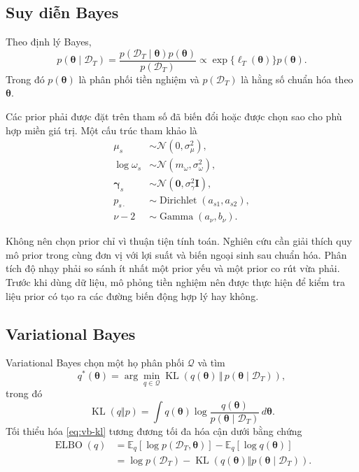 \documentclass[12pt,a4paper]{article}
\numberwithin{equation}{section}
\newcommand{\bm}[1]{\symbf{#1}}
\newcommand{\Data}{\mathcal{D}}
\newcommand{\Param}{\bm{\theta}}
\newcommand{\E}{\mathbb{E}}
\newcommand{\ELBO}{\operatorname{ELBO}}
\newcommand{\KL}{\operatorname{KL}}
\begin{document}
\subsection{Suy diễn Bayes}\label{subsec:bayes}

Theo định lý Bayes,
\begin{equation}
  p(\Param\mid\Data_T)
  =
  \frac{p(\Data_T\mid\Param)p(\Param)}{p(\Data_T)}
  \propto
  \exp\{\ell_T(\Param)\}p(\Param).
  \label{eq:bayes-posterior}
\end{equation}
Trong đó $p(\Param)$ là phân phối tiền nghiệm và $p(\Data_T)$ là hằng số chuẩn hóa theo $\Param$.

Các prior phải được đặt trên tham số đã biến đổi hoặc được chọn sao cho phù hợp miền giá trị. Một cấu trúc tham khảo là
\begin{align}
  \mu_s &\sim \mathcal{N}(0,\sigma_{\mu}^{2}),
  \label{eq:prior-mu}\\
  \log\omega_s &\sim \mathcal{N}(m_{\omega},\sigma_{\omega}^{2}),
  \label{eq:prior-omega}\\
  \bm\gamma_s &\sim \mathcal{N}(\bm 0,\sigma_{\gamma}^{2}\bm I),
  \label{eq:prior-gamma}\\
  p_{s\cdot} &\sim \operatorname{Dirichlet}(a_{s1},a_{s2}),
  \label{eq:prior-transition}\\
  \nu-2 &\sim \operatorname{Gamma}(a_{\nu},b_{\nu}).
  \label{eq:prior-df}
\end{align}

Không nên chọn prior chỉ vì thuận tiện tính toán. Nghiên cứu cần giải thích quy mô prior trong cùng đơn vị với lợi suất và biến ngoại sinh sau chuẩn hóa. Phân tích độ nhạy phải so sánh ít nhất một prior yếu và một prior co rút vừa phải. Trước khi dùng dữ liệu, mô phỏng tiền nghiệm nên được thực hiện để kiểm tra liệu prior có tạo ra các đường biến động hợp lý hay không.

\subsection{Variational Bayes}\label{subsec:vb}

Variational Bayes chọn một họ phân phối $\mathcal{Q}$ và tìm
\begin{equation}
  q^{*}(\Param)
  =
  \arg\min_{q\in\mathcal{Q}}
  \KL\!\left(q(\Param)\,\Vert\,p(\Param\mid\Data_T)\right),
  \label{eq:vb-kl}
\end{equation}
trong đó
\begin{equation}
  \KL(q\Vert p)
  =
  \int q(\Param)
  \log\frac{q(\Param)}{p(\Param\mid\Data_T)}\,d\Param.
  \label{eq:kl-definition}
\end{equation}
Tối thiểu hóa \cref{eq:vb-kl} tương đương tối đa hóa cận dưới bằng chứng
\begin{align}
  \ELBO(q)
  &=
  \E_q\!\left[\log p(\Data_T,\Param)\right]
  -\E_q\!\left[\log q(\Param)\right]
  \label{eq:elbo}\\
  &=
  \log p(\Data_T)
  -\KL\!\left(q(\Param)\Vert p(\Param\mid\Data_T)\right).
  \label{eq:elbo-identity}
\end{align}
\end{document}
